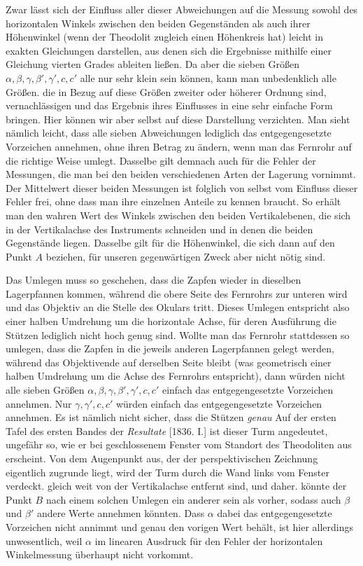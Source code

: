 Zwar lässt sich der Einfluss aller dieser Abweichungen auf die Messung sowohl des horizontalen Winkels zwischen den beiden Gegenständen als auch ihrer Höhenwinkel (wenn der Theodolit zugleich einen Höhenkreis hat) leicht in exakten Gleichungen darstellen, aus denen sich die Ergebnisse mithilfe einer Gleichung vierten Grades ableiten ließen. Da aber die sieben Größen $\alpha,\beta,\gamma,\beta',\gamma',c,c'$ alle nur sehr klein sein können, kann man unbedenklich alle Größen. die in Bezug auf diese Größen zweiter oder höherer Ordnung sind, vernachlässigen und das Ergebnis ihres Einflusses in eine sehr einfache Form bringen. Hier können wir aber selbst auf diese Darstellung verzichten. Man sieht nämlich leicht, dass alle sieben Abweichungen lediglich das entgegengesetzte Vorzeichen annehmen, ohne ihren Betrag zu ändern, wenn man das Fernrohr auf die richtige Weise umlegt. Dasselbe gilt demnach auch für die Fehler der Messungen, die man bei den beiden verschiedenen Arten der Lagerung vornimmt. Der Mittelwert dieser beiden Messungen ist folglich von selbst vom Einfluss dieser Fehler frei, ohne dass man ihre einzelnen Anteile zu kennen braucht. So erhält man den wahren Wert des Winkels zwischen den beiden Vertikalebenen, die sich in der Vertikalachse des Instruments schneiden und in denen die beiden Gegenstände liegen. Dasselbe gilt für die Höhenwinkel, die sich dann auf den Punkt $A$ beziehen, für unseren gegenwärtigen Zweck aber nicht nötig sind.

Das Umlegen muss so geschehen, dass die Zapfen wieder in dieselben Lagerpfannen kommen, während die obere Seite des Fernrohrs zur unteren wird und das Objektiv an die Stelle des Okulars tritt. Dieses Umlegen entspricht also einer halben Umdrehung um die horizontale Achse, für deren Ausführung die Stützen lediglich nicht hoch genug sind. Wollte man das Fernrohr stattdessen so umlegen, dass die Zapfen in die jeweils anderen Lagerpfannen gelegt werden, während das Objektivende auf derselben Seite bleibt (was geometrisch einer halben Umdrehung um die Achse des Fernrohrs entspricht), dann würden nicht alle sieben Größen $\alpha,\beta,\gamma,\beta',\gamma',c,c'$ einfach das entgegengesetzte Vorzeichen annehmen. Nur $\gamma,\gamma',c,c'$ würden einfach das entgegengesetzte Vorzeichen annehmen. Es ist nämlich nicht sicher, dass die Stützen \textit{genau}
\expandafter\def\csname HistoricalNoteText445\endcsname{Auf der ersten Tafel des ersten Bandes der \textit{Resultate} [1836. I.] ist dieser Turm angedeutet, ungefähr so, wie er bei geschlossenem Fenster vom Standort des Theodoliten aus erscheint. Von dem Augenpunkt aus, der der perspektivischen Zeichnung eigentlich zugrunde liegt, wird der Turm durch die Wand links vom Fenster verdeckt.}%
gleich weit von der Vertikalachse entfernt sind, und daher. könnte der Punkt $B$ nach einem solchen Umlegen ein anderer sein als vorher, sodass auch $\beta$ und $\beta'$ andere Werte annehmen könnten. Dass $\alpha$ dabei das entgegengesetzte Vorzeichen nicht annimmt und genau den vorigen Wert behält, ist hier allerdings unwesentlich, weil $\alpha$ im linearen Ausdruck für den Fehler der horizontalen Winkelmessung überhaupt nicht vorkommt.

